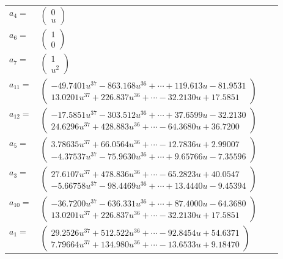 \documentclass[1p]{elsarticle_modified}
\theoremstyle{definition}
\begin{document}
\begin{tabular}{m{7pt} m{180pt} m{7pt} m{180pt} }
\flushright $a_{4}=$&$\begin{pmatrix}0\\u\end{pmatrix}$ \\
\flushright $a_{6}=$&$\begin{pmatrix}1\\0\end{pmatrix}$ \\
\flushright $a_{7}=$&$\begin{pmatrix}1\\u^2\end{pmatrix}$ \\
\flushright $a_{11}=$&$\begin{pmatrix}-49.7401 u^{37}-863.168 u^{36}+\cdots+119.613 u-81.9531\\13.0201 u^{37}+226.837 u^{36}+\cdots-32.2130 u+17.5851\end{pmatrix}$ \\
\flushright $a_{12}=$&$\begin{pmatrix}-17.5851 u^{37}-303.512 u^{36}+\cdots+37.6599 u-32.2130\\24.6296 u^{37}+428.883 u^{36}+\cdots-64.3680 u+36.7200\end{pmatrix}$ \\
\flushright $a_{5}=$&$\begin{pmatrix}3.78635 u^{37}+66.0564 u^{36}+\cdots-12.7836 u+2.99007\\-4.37537 u^{37}-75.9630 u^{36}+\cdots+9.65766 u-7.35596\end{pmatrix}$ \\
\flushright $a_{3}=$&$\begin{pmatrix}27.6107 u^{37}+478.836 u^{36}+\cdots-65.2823 u+40.0547\\-5.66758 u^{37}-98.4469 u^{36}+\cdots+13.4440 u-9.45394\end{pmatrix}$ \\
\flushright $a_{10}=$&$\begin{pmatrix}-36.7200 u^{37}-636.331 u^{36}+\cdots+87.4000 u-64.3680\\13.0201 u^{37}+226.837 u^{36}+\cdots-32.2130 u+17.5851\end{pmatrix}$ \\
\flushright $a_{1}=$&$\begin{pmatrix}29.2526 u^{37}+512.522 u^{36}+\cdots-92.8454 u+54.6371\\7.79664 u^{37}+134.980 u^{36}+\cdots-13.6533 u+9.18470\end{pmatrix}$ \\

\end{tabular}
\end{document}
